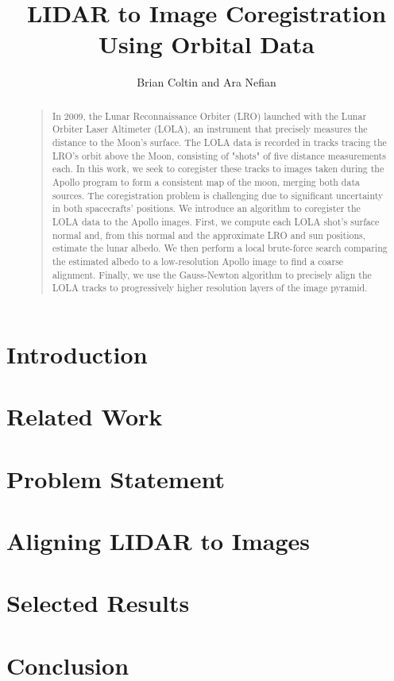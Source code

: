\documentclass[letterpaper]{article}
\begin{document}
\title{LIDAR to Image Coregistration Using Orbital Data}
\author{Brian Coltin and Ara Nefian}
\maketitle
\begin{abstract}
\begin{quote}
In 2009, the Lunar Reconnaissance Orbiter (LRO) launched with the Lunar Orbiter Laser
Altimeter (LOLA), an instrument that precisely measures the distance to the Moon's
surface. The LOLA data is recorded in tracks tracing the LRO's orbit above the Moon,
consisting of "shots" of five distance measurements each. In this work, we seek to
coregister these tracks to images taken during the Apollo program to form a consistent
map of the moon, merging both data sources. The coregistration problem is challenging
due to significant uncertainty in both spacecrafts' positions. We introduce an algorithm
to coregister the LOLA data to the Apollo images. First, we compute each LOLA shot's
surface normal and, from this normal and the approximate LRO and sun positions,
estimate the lunar albedo. We then perform a local brute-force search comparing the
estimated albedo to a low-resolution Apollo image to find a coarse alignment. Finally,
we use the Gauss-Newton algorithm to precisely align the LOLA tracks to progressively
higher resolution layers of the image pyramid.
\end{quote}
\end{abstract}

\section{Introduction}

\section{Related Work}

\section{Problem Statement}

\section{Aligning LIDAR to Images}

\section{Selected Results}

\section{Conclusion}




\end{document}
